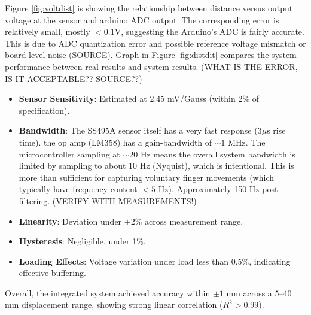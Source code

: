 \documentclass[a4paper,12pt]{article}
\begin{document}
Figure \ref{fig:voltdist} is showing the relationship between distance versus output voltage at the sensor and arduino ADC output. The corresponding error is relatively small, mostly $< 0.1$V, suggesting the Arduino's ADC is fairly accurate. This is due to ADC quantization error and possible reference voltage mismatch or board-level noise (SOURCE). Graph in Figure \ref{fig:distdit} compares the system performance between real results and system results. (WHAT IS THE ERROR, IS IT ACCEPTABLE?? SOURCE??) 

\begin{itemize}
    \item \textbf{Sensor Sensitivity}: Estimated at 2.45 mV/Gauss (within 2\% of specification).
    \item \textbf{Bandwidth}: The SS495A sensor itself has a very fast response ($3 \mu$s rise time). the op amp (LM358) has a gain-bandwidth of $\sim 1$ MHz. The microcontroller sampling at $\sim 20$ Hz means the overall system bandwidth is limited by sampling to about 10 Hz (Nyquist), which is intentional. This is more than sufficient for capturing voluntary finger movements (which typically have frequency content $< 5$ Hz). Approximately 150 Hz post-filtering. (VERIFY WITH MEASUREMENTS!)
    \item \textbf{Linearity}: Deviation under $\pm2\%$ across measurement range.
    \item \textbf{Hysteresis}: Negligible, under 1\%.
    \item \textbf{Loading Effects}: Voltage variation under load less than 0.5\%, indicating effective buffering.
\end{itemize}

Overall, the integrated system achieved accuracy within $\pm 1$ mm across a 5--40 mm displacement range, showing strong linear correlation ($R^2 > 0.99$).


%
\end{document}
